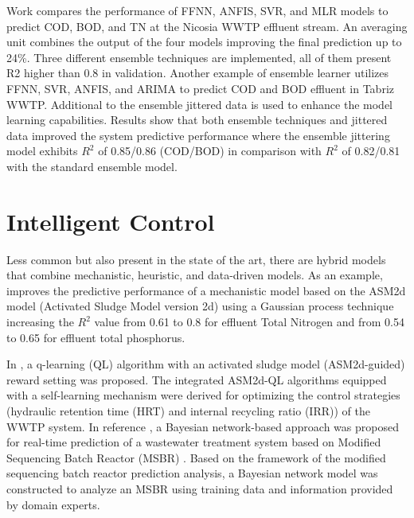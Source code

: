 Work \cite{Nourani2018} compares the performance of FFNN, ANFIS, SVR, and MLR models to predict COD, BOD, and TN at the Nicosia WWTP effluent stream. An averaging unit combines the output of the four models improving the final prediction up to 24\%. Three different ensemble techniques are implemented, all of them present R2 higher than 0.8 in validation. Another example of ensemble learner \cite{Nourani2021} utilizes FFNN, SVR, ANFIS, and ARIMA to predict COD and BOD effluent in Tabriz WWTP. Additional to the ensemble jittered data is used to enhance the model learning capabilities. Results show that both ensemble techniques and jittered data improved the system predictive performance where the ensemble jittering model exhibits \begin{math}R^2\end{math} of 0.85/0.86 (COD/BOD) in comparison with \begin{math}R^2\end{math} of 0.82/0.81 with the standard ensemble model.  

\section{Intelligent Control}
\label{s:RelatedWorks-Control}

Less common but also present in the state of the art, there are hybrid models that combine mechanistic, heuristic, and data-driven models. As an example, \cite{Hvala2020} improves the predictive performance of a mechanistic model based on the ASM2d model (Activated Sludge Model version 2d) using a Gaussian process technique increasing the \begin{math}R^2\end{math} value from 0.61 to 0.8 for effluent Total Nitrogen and from 0.54 to 0.65 for effluent total phosphorus.

In \cite{Pang2019}, a q-learning (QL) algorithm with an activated sludge model (ASM2d-guided) reward setting was proposed. The integrated ASM2d-QL algorithms equipped with a self-learning mechanism were derived for optimizing the control strategies (hydraulic retention time (HRT) and internal recycling ratio (IRR)) of the WWTP system. In reference \cite{Li2013}, a Bayesian network-based approach was proposed for real-time prediction of a wastewater treatment system based on Modified Sequencing Batch Reactor (MSBR) . Based on the framework of the modified sequencing batch reactor prediction analysis, a Bayesian network model was constructed to analyze an MSBR using training data and information provided by domain experts.

